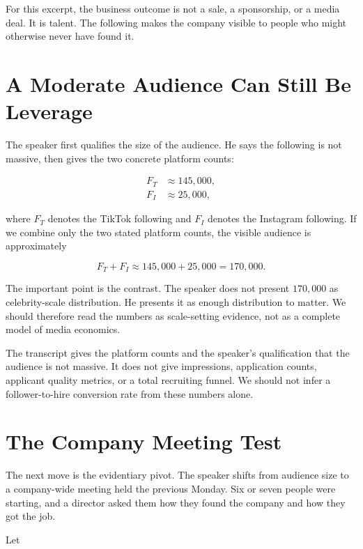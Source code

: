 For this excerpt, the business outcome is not a sale, a sponsorship, or a media deal. It is talent. The following makes the company visible to people who might otherwise never have found it.

\section{A Moderate Audience Can Still Be Leverage}

The speaker first qualifies the size of the audience. He says the following is not massive, then gives the two concrete platform counts:

\begin{align}
F_T &\approx 145{,}000,\\
F_I &\approx 25{,}000,
\end{align}

where \(F_T\) denotes the TikTok following and \(F_I\) denotes the Instagram following. If we combine only the two stated platform counts, the visible audience is approximately

\begin{equation}
F_T + F_I \approx 145{,}000 + 25{,}000 = 170{,}000.
\end{equation}

The important point is the contrast. The speaker does not present \(170{,}000\) as celebrity-scale distribution. He presents it as enough distribution to matter. We should therefore read the numbers as scale-setting evidence, not as a complete model of media economics.

\begin{remark}
The transcript gives the platform counts and the speaker's qualification that the audience is not massive. It does not give impressions, application counts, applicant quality metrics, or a total recruiting funnel. We should not infer a follower-to-hire conversion rate from these numbers alone.
\end{remark}

\section{The Company Meeting Test}

The next move is the evidentiary pivot. The speaker shifts from audience size to a company-wide meeting held the previous Monday. Six or seven people were starting, and a director asked them how they found the company and how they got the job.

Let

